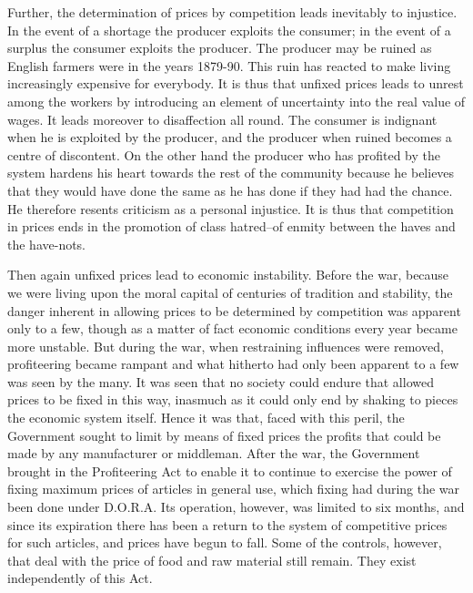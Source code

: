 \documentclass{book}
\begin{document}
Further, the determination of prices by competition leads inevitably to injustice. In the event of a shortage the producer exploits the consumer; in the event of a surplus the consumer exploits the producer. The producer may be ruined as English farmers were in the years 1879-90. This ruin has reacted to make living increasingly expensive for everybody. It is thus that unfixed prices leads to unrest among the workers by introducing an element of uncertainty into the real value of wages. It leads moreover to disaffection all round. The consumer is indignant when he is exploited by the producer, and the producer when ruined becomes a centre of discontent. On the other hand the producer who has profited by the system hardens his heart towards the rest of the community because he believes that they would have done the same as he has done if they had had the chance. He therefore resents criticism as a personal injustice. It is thus that competition in prices ends in the promotion of class hatred–of enmity between the haves and the have-nots.

Then again unfixed prices lead to economic instability. Before the war, because we were living upon the moral capital of centuries of tradition and stability, the danger inherent in allowing prices to be determined by competition was apparent only to a few, though as a matter of fact economic conditions every year became more unstable. But during the war, when restraining influences were removed, profiteering became rampant and what hitherto had only been apparent to a few was seen by the many. It was seen that no society could endure that allowed prices to be fixed in this way, inasmuch as it could only end by shaking to pieces the economic system itself. Hence it was that, faced with this peril, the Government sought to limit by means of fixed prices the profits that could be made by any manufacturer or middleman. After the war, the Government brought in the Profiteering Act to enable it to continue to exercise the power of fixing maximum prices of articles in general use, which fixing had during the war been done under D.O.R.A. Its operation, however, was limited to six months, and since its expiration there has been a return to the system of competitive prices for such articles, and prices have begun to fall. Some of the controls, however, that deal with the price of food and raw material still remain. They exist independently of this Act.
\end{document}

